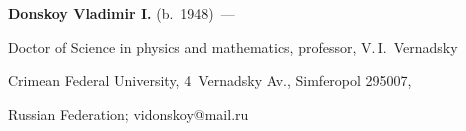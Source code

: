 \Contrl





\noindent


\textbf{Donskoy Vladimir I.} (b.\ 1948)~--- 


Doctor of Science in physics and mathematics, professor, V.\,I.~Vernadsky 


Crimean Federal University, 4~Vernadsky Av., Simferopol 295007, 


Russian Federation; \mbox{vidonskoy@mail.ru}


\label{end\stat}





\renewcommand{\bibname}{\protect\rm Литература} 





\renewcommand{\figurename}{\protect\bf Рис.}


